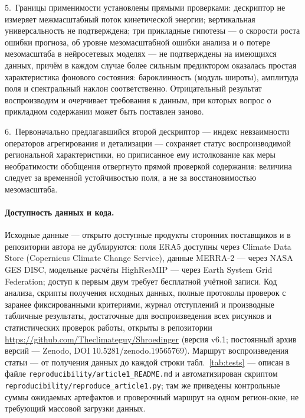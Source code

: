 \documentclass[11pt,a4paper]{article}
\begin{document}
5.~Границы применимости установлены прямыми проверками: дескриптор не измеряет межмасштабный поток кинетической энергии; вертикальная универсальность не подтверждена; три прикладные гипотезы --- о скорости роста ошибки прогноза, об уровне мезомасштабной ошибки анализа и о потере мезомасштаба в нейросетевых моделях --- не подтверждены на имеющихся данных, причём в каждом случае более сильным предиктором оказалась простая характеристика фонового состояния: бароклинность (модуль широты), амплитуда поля и спектральный наклон соответственно. Отрицательный результат воспроизводим и очерчивает требования к данным, при которых вопрос о прикладном содержании может быть поставлен заново.

6.~Первоначально предлагавшийся второй дескриптор --- индекс невзаимности операторов агрегирования и детализации --- сохраняет статус воспроизводимой региональной характеристики, но приписанное ему истолкование как меры необратимости обобщения отвергнуто прямой проверкой содержания: величина следует за временн\'{о}й устойчивостью поля, а не за восстановимостью мезомасштаба.

\paragraph{Доступность данных и кода.} Исходные данные --- открыто доступные продукты сторонних поставщиков и в репозитории автора не дублируются: поля ERA5 доступны через Climate Data Store (Copernicus Climate Change Service), данные MERRA-2 --- через NASA GES DISC, модельные расчёты HighResMIP --- через Earth System Grid Federation; доступ к первым двум требует бесплатной учётной записи. Код анализа, скрипты получения исходных данных, полные протоколы проверок с заранее фиксированными критериями, журнал отступлений и производные табличные результаты, достаточные для воспроизведения всех рисунков и статистических проверок работы, открыты в репозитории \url{https://github.com/Theclimateguy/Shroedinger} (версия v6.1; постоянный архив версий --- Zenodo, DOI 10.5281/zenodo.19565769). Маршрут воспроизведения статьи --- от получения данных до каждой строки табл.~\ref{tab:tests} --- описан в файле \texttt{reproducibility/article1\_README.md} и автоматизирован скриптом \texttt{reproducibility/reproduce\_article1.py}; там же приведены контрольные суммы ожидаемых артефактов и проверочный маршрут на одном регион-окне, не требующий массовой загрузки данных.

\printbibliography[title={Список литературы}]
\end{document}
